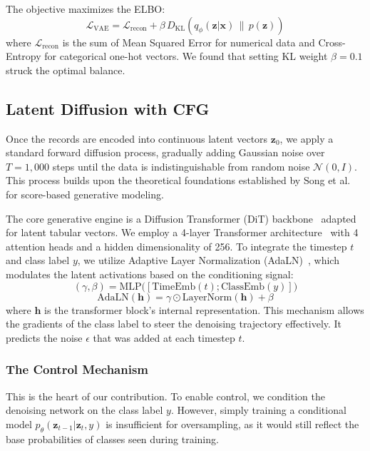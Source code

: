 \documentclass[conference]{IEEEtran}
\begin{document}
The objective maximizes the ELBO:
\begin{equation}
\mathcal{L}_{\mathrm{VAE}} = \mathcal{L}_{\mathrm{recon}} + \beta \, D_{\mathrm{KL}}(q_\phi(\mathbf{z}|\mathbf{x}) \,\|\, p(\mathbf{z}))
\end{equation}
where $\mathcal{L}_{\mathrm{recon}}$ is the sum of Mean Squared Error for numerical data and Cross-Entropy for categorical one-hot vectors. We found that setting KL weight $\beta = 0.1$ struck the optimal balance.

\subsection{Latent Diffusion with CFG}
Once the records are encoded into continuous latent vectors $\mathbf{z}_0$, we apply a standard forward diffusion process, gradually adding Gaussian noise over $T = 1{,}000$ steps until the data is indistinguishable from random noise $\mathcal{N}(0, I)$. This process builds upon the theoretical foundations established by Song et al.~\cite{song2021score} for score-based generative modeling.

The core generative engine is a Diffusion Transformer (DiT) backbone~\cite{peebles2023dit} adapted for latent tabular vectors. We employ a 4-layer Transformer architecture~\cite{vaswani2017attention} with 4 attention heads and a hidden dimensionality of 256. To integrate the timestep $t$ and class label $y$, we utilize Adaptive Layer Normalization (AdaLN)~\cite{ba2016layernorm}, which modulates the latent activations based on the conditioning signal:
\begin{equation}
(\gamma, \beta) = \mathrm{MLP}\bigl([\text{TimeEmb}(t); \text{ClassEmb}(y)]\bigr)
\end{equation}
\begin{equation}
\mathrm{AdaLN}(\mathbf{h}) = \gamma \odot \mathrm{LayerNorm}(\mathbf{h}) + \beta
\end{equation}
where $\mathbf{h}$ is the transformer block's internal representation. This mechanism allows the gradients of the class label to steer the denoising trajectory effectively. It predicts the noise $\epsilon$ that was added at each timestep $t$.

\subsubsection{The Control Mechanism}
This is the heart of our contribution. To enable control, we condition the denoising network on the class label $y$. However, simply training a conditional model $p_\theta(\mathbf{z}_{t-1}|\mathbf{z}_t, y)$ is insufficient for oversampling, as it would still reflect the base probabilities of classes seen during training.
\end{document}
